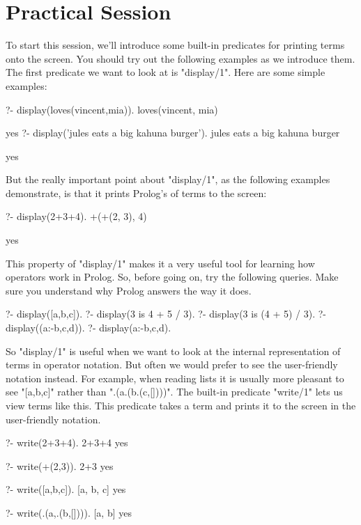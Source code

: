 \section{Practical Session}\label{SEC.L9.PRAXIS}



To start this session, we'll introduce some built-in predicates for
printing terms onto the screen. You should try out the following
examples as we introduce them.  The first predicate we want to look at
is "display/1". Here are
some simple examples:
\begin{LPNcodedisplay}
?- display(loves(vincent,mia)).
loves(vincent, mia)

yes
?- display('jules eats a big kahuna burger').
jules eats a big kahuna burger

yes
\end{LPNcodedisplay}

But the really important point about "display/1", as the following
examples demonstrate, is that it prints Prolog's  of terms to the screen:

\begin{LPNcodedisplay}
?- display(2+3+4).
+(+(2, 3), 4)

yes
\end{LPNcodedisplay}


This property of "display/1" makes it a very useful tool for learning
how operators work in Prolog. So, before going on, try the following
queries. Make sure you understand why Prolog answers the way it does.

\begin{LPNcodedisplay}
?- display([a,b,c]).
?- display(3 is 4 + 5 / 3).
?- display(3 is (4 + 5) / 3).
?- display((a:-b,c,d)).
?- display(a:-b,c,d).
\end{LPNcodedisplay}


So "display/1" is useful when we want to look at the internal
representation of terms in operator notation. But often we would
prefer to see the user-friendly notation instead. For example, when
reading lists it is usually more pleasant to see "[a,b,c]" rather
than ".(a.(b.(c,[])))". The built-in predicate "write/1" lets us
view terms like
this. This predicate takes a
term and prints it to the screen in the user-friendly notation.

\begin{LPNcodedisplay}
?- write(2+3+4).
2+3+4
yes

?- write(+(2,3)).
2+3
yes

?- write([a,b,c]).
[a, b, c]
yes

?- write(.(a,.(b,[]))).
[a, b]
yes
\end{LPNcodedisplay}


